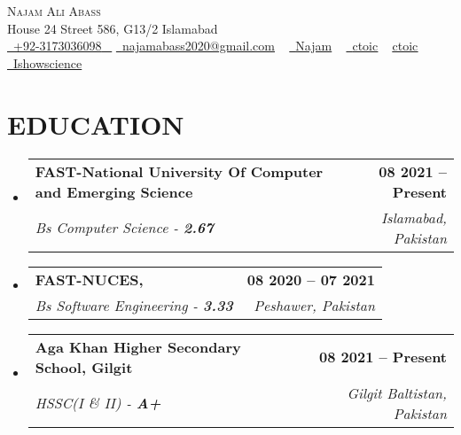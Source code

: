 \documentclass[letterpaper,11pt]{article}
\makeatletter
\newcommand{\resumeSubheading}[4]{
  \vspace{-2pt}\item
    \begin{tabular*}{1.0\textwidth}[t]{l@{\extracolsep{\fill}}r}
      \textbf{\large#1} & \textbf{\small #2} \\
      \textit{\large#3} & \textit{\small #4} \\
     
    \end{tabular*}\vspace{-7pt}
}
\newcommand{\resumeSubHeadingListStart}{\begin{itemize}[leftmargin=0.0in, label={}]}
\newcommand{\resumeSubHeadingListEnd}{\end{itemize}}
\makeatother
\begin{document}

\begin{center}
    {\Huge \scshape Najam Ali Abass} \\ \vspace{1pt}
    House 24 Street 586, G13/2 Islamabad \\ \vspace{1pt}
    \small \href{tel:+92-3173036098}{ \raisebox{-0.1\height}\faPhone\ \underline{+92-3173036098} ~} \href{mailto:najamabass2020@gmail.com}{\raisebox{-0.2\height}\faEnvelope\  \underline{najamabass2020@gmail.com}} ~
    \href{https://www.linkedin.com/in/ctoic/}{\raisebox{-0.1\height}\faLinkedinSquare\ \underline{Najam}}  ~
    \href{https://github.com/Ctoic}{\raisebox{-0.2\height}\faGithub\ \underline{ctoic}} ~
    \href{https://www.instagram.com/dev_with_ctoic}{\raisebox{-0.2\height}\faInstagram \underline{ctoic}} ~
    \href{https://codeforces.com/profile/yourid}{\raisebox{-0.2\height}\faYoutube\ \underline{Ishowscience}}
    
    
    \vspace{-8pt}
\end{center}




\section{EDUCATION}
 \resumeSubHeadingListStart
    \resumeSubheading
      {FAST-National University Of Computer and Emerging Science}{08 2021 -- Present}
      {Bs Computer Science   - \textbf{2.67} }{Islamabad, Pakistan}
  \resumeSubHeadingListEnd
  \resumeSubHeadingListStart
    \resumeSubheading
      {FAST-NUCES,}{08 2020 -- 07 2021}
      {Bs Software Engineering - \textbf{3.33} }{Peshawer, Pakistan}
  \resumeSubHeadingListEnd
 
  \resumeSubHeadingListStart
    \resumeSubheading
      {Aga Khan Higher Secondary School, Gilgit}{08 2021 -- Present}
      {HSSC(I \& II)   - \textbf{A+} }{Gilgit Baltistan, Pakistan}
  \resumeSubHeadingListEnd


\end{document}
